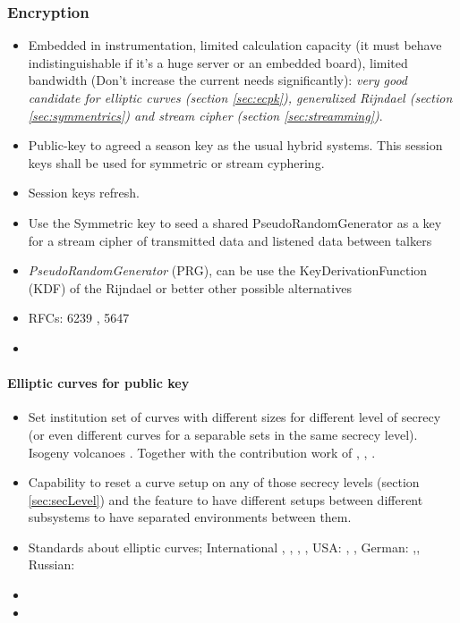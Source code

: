 \documentclass[10pt,a4paper,twoside]{llncs}
\begin{document}
\subsubsection{Encryption \label{sec:encryption}}

\begin{itemize}
    \item Embedded in instrumentation, limited calculation capacity (it must behave indistinguishable if it's a huge server or an embedded board), limited bandwidth (Don't increase the current needs significantly): \emph{very good candidate for elliptic curves (section \ref{sec:ecpk}), generalized Rijndael (section \ref{sec:symmentrics}) and stream cipher (section \ref{sec:streamming})}.
    \item Public-key to agreed a season key as the usual hybrid systems. This session keys shall be used for symmetric or stream cyphering.
    \item Session keys refresh.
    \item Use the Symmetric key to seed a shared PseudoRandomGenerator as a key for a stream cipher of transmitted data and listened data between talkers
    \item \emph{PseudoRandomGenerator} (PRG), can be use the KeyDerivationFunction (KDF) of the Rijndael or better other possible alternatives
    \item RFCs: 6239 \cite{rfc6239}, 5647 \cite{rfc5647}
    \item 
\end{itemize}


\paragraph{Elliptic curves for public key \label{sec:ecpk}}

\begin{itemize}
    \item Set institution set of curves with different sizes for different level of secrecy (or even different curves for a separable sets in the same secrecy level). Isogeny volcanoes \cite{secRickShareECs}. Together with the contribution work of \cite{JValera11}, \cite{Ramiro05}, \cite{Rosana11}.
    \item Capability to reset a curve setup on any of those secrecy levels (section \ref{sec:secLevel}) and the feature to have different setups between different subsystems to have separated environments between them.
    \item Standards about elliptic curves; International \cite{rfc6637}, \cite{_rfc4492}, \cite{sec1}, \cite{sec2}, USA: \cite{P1363}, \cite{X9.62-1998}, German: \cite{brainpool},\cite{BSI_TR-03111}, Russian: \cite{GOSTR341001}
    \item 
    \item 
\end{itemize}
\end{document}
